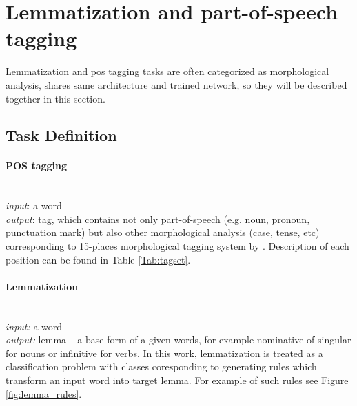 \section{Lemmatization and part-of-speech tagging}
\label{chap:tag}
Lemmatization and \acrlong{pos} tagging tasks are often categorized as morphological analysis, shares same architecture and trained network, so they will be described together in this section.
\subsection{Task Definition}

\paragraph{\textbf{POS tagging}} \mbox{}\\
\textit{input}: a word \\
\textit{output}: tag, which contains not only part-of-speech (e.g. noun, pronoun, punctuation mark) but also other morphological analysis (case, tense, etc) corresponding to 15-places morphological tagging system by \cite{Hajic2004}. Description of each position can be found in Table \ref{Tab:tagset}. %

\paragraph{\textbf{Lemmatization}} \mbox{}\\
\textit{input:} a word \\
\textit{output:} lemma -- a base form of a given words, for example nominative of singular for nouns or infinitive for verbs. In this work, lemmatization is treated as a classification problem with classes coresponding to generating rules which transform an input word into target lemma. For example of such rules see Figure \ref{fig:lemma_rules}. \\ %




